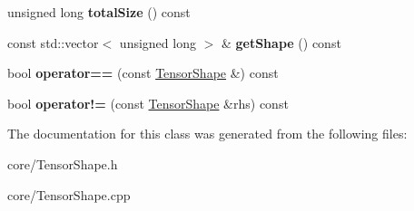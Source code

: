 \begin{DoxyCompactItemize}
unsigned long {\bfseries total\+Size} () const
\item 
\mbox{\label{classathena_1_1core_1_1_tensor_shape_ab76bd8f258b315eedcae3eae2d46a73d}} 
const std\+::vector$<$ unsigned long $>$ \& {\bfseries get\+Shape} () const
\item 
\mbox{\label{classathena_1_1core_1_1_tensor_shape_aa42737e3e51e76507bb60791889d4d9b}} 
bool {\bfseries operator==} (const \mbox{\hyperlink{classathena_1_1core_1_1_tensor_shape}{Tensor\+Shape}} \&) const
\item 
\mbox{\label{classathena_1_1core_1_1_tensor_shape_acdb5b20f9922cb4d7ee29a868fd05b1b}} 
bool {\bfseries operator!=} (const \mbox{\hyperlink{classathena_1_1core_1_1_tensor_shape}{Tensor\+Shape}} \&rhs) const
\end{DoxyCompactItemize}


The documentation for this class was generated from the following files\+:\begin{DoxyCompactItemize}
\item 
core/Tensor\+Shape.\+h\item 
core/Tensor\+Shape.\+cpp\end{DoxyCompactItemize}
